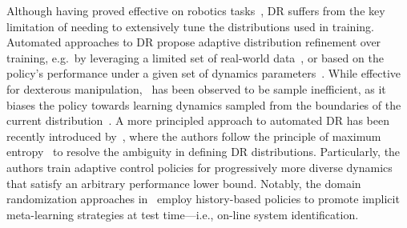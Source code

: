 Although having proved effective on robotics tasks~\citep{antonova2017reinforcement}, DR suffers from the key limitation of needing to extensively tune the distributions used in training. Automated approaches to DR propose adaptive distribution refinement over training, e.g.~by leveraging a limited set of real-world data~\cite{tiboniadrbenchmark,tiboni2023dropo}, or based on the policy's performance under a given set of dynamics parameters~\citep{akkaya2019solving}. While effective for dexterous manipulation,~\citet{akkaya2019solving} has been observed to be sample inefficient, as it biases the policy towards learning dynamics sampled from the boundaries of the current distribution~\citep{tiboni2023domain}. A more principled approach to automated DR has been recently introduced by~\citep{tiboni2023domain}, where the authors follow the principle of maximum entropy~\citep{jaynes1957information} to resolve the ambiguity in defining DR distributions. Particularly, the authors train adaptive control policies for progressively more diverse dynamics that satisfy an arbitrary performance lower bound.
Notably, the domain randomization approaches in~\citet{akkaya2019solving,tiboni2023domain} employ history-based policies to promote implicit meta-learning strategies at test time---i.e., on-line system identification.
